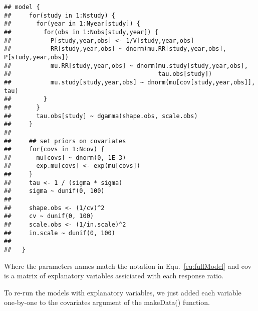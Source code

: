 \documentclass{article}\usepackage[]{graphicx}\usepackage[]{color}
\makeatletter
\newenvironment{kframe}{%
 \def\at@end@of@kframe{}%
 \ifinner\ifhmode%
  \def\at@end@of@kframe{\end{minipage}}%
  \begin{minipage}{\columnwidth}%
 \fi\fi%
 \def\FrameCommand##1{\hskip\@totalleftmargin \hskip-\fboxsep
 \colorbox{shadecolor}{##1}\hskip-\fboxsep
     \hskip-\linewidth \hskip-\@totalleftmargin \hskip\columnwidth}%
 \MakeFramed {\advance\hsize-\width
   \@totalleftmargin\z@ \linewidth\hsize
   \@setminipage}}%
 {\par\unskip\endMakeFramed%
 \at@end@of@kframe}
\newenvironment{knitrout}{}{} %
\makeatother
\begin{document}
\begin{knitrout}
\color{fgcolor}\begin{kframe}
\begin{verbatim}
## model {
##     for(study in 1:Nstudy) {
##       for(year in 1:Nyear[study]) {
##         for(obs in 1:Nobs[study,year]) {
##           P[study,year,obs] <- 1/V[study,year,obs]
##           RR[study,year,obs] ~ dnorm(mu.RR[study,year,obs], P[study,year,obs])
##           mu.RR[study,year,obs] ~ dnorm(mu.study[study,year,obs],
##                                         tau.obs[study])
##           mu.study[study,year,obs] ~ dnorm(mu[cov[study,year,obs]], tau)
##         }
##       }
##       tau.obs[study] ~ dgamma(shape.obs, scale.obs)
##     }
## 
##     ## set priors on covariates
##     for(covs in 1:Ncov) {
##       mu[covs] ~ dnorm(0, 1E-3)
##       exp.mu[covs] <- exp(mu[covs])
##     }
##     tau <- 1 / (sigma * sigma)
##     sigma ~ dunif(0, 100)
## 
##     shape.obs <- (1/cv)^2
##     cv ~ dunif(0, 100)
##     scale.obs <- (1/in.scale)^2
##     in.scale ~ dunif(0, 100)
## 
##   }
\end{verbatim}
\end{kframe}
\end{knitrout}

Where the parameters names match the notation in
Equ.~\ref{eq:fullModel} and cov is a matrix of explanatory variables
assiciated with each response ratio.

To re-run the models with explanatory variables, we just added each
variable one-by-one to the covariates argument of the makeData()
function.

 \clearpage
\end{document}
